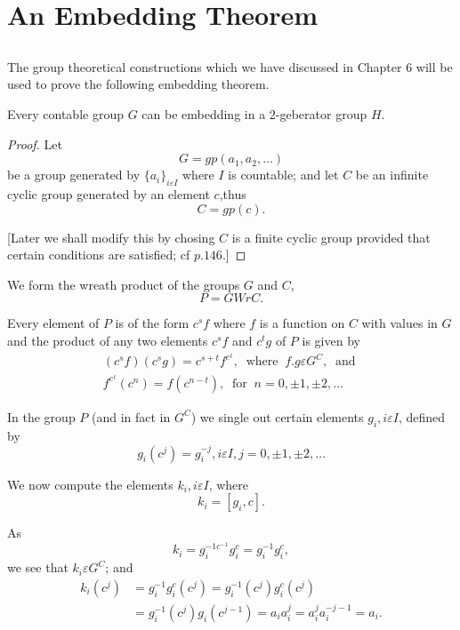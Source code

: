 \chapter{An Embedding Theorem}%

\section{}%

The group theoretical constructions which we have discussed in Chapter
$6$ will be used to prove the following embedding theorem. 
\setcounter{Theorem}{0}
\begin{Theorem}%
  Every contable group $G$ can be embedding in a $2$-geberator group $H$.
\end{Theorem}

\begin{proof}
  Let
  $$
  G = gp (a_1,a_2, \ldots)
  $$
  be a group generated by $\{ a_i\}_{i \varepsilon I}$ where $I$ is
  countable; and let $C$ be an infinite cyclic group generated by an
  element $c$,thus 
  $$
  C= gp (c).
  $$
  
  [Later we shall modify this by chosing $C$ is a finite cyclic group
    provided that certain conditions are satisfied; cf $p. 146$.] 
\end{proof}

We form the wreath product of the groups $G$ and $C$, 
$$
P= G Wr C.
$$

Every element of $P$ is of the form $c^s f$ where $f$ is a function on
$C$ with values in $G$ and the product of any two elements $c^sf$ and
$c^tg$ of $P$ is given by 
\begin{multline*}
  (c^s f) (c^s g) = c^{s+t} f^c{^{^t}}, ~\text{ where }~ f.g \varepsilon
  G^C, ~\text{ and }\\
  f^c{^{^t}} (c^n) = f (c^{n-t}), ~\text{ for }~ n =0,
  \pm 1, \pm 2,\ldots 
\end{multline*}

In the group $P$ (and in fact in $G^C$) we single out certain elements
$g_i, i \varepsilon I$, defined by 
$$
g_i (c^j) = g^{-j}_i, i \varepsilon I, j=0, \pm 1, \pm 2, \ldots
$$

We now compute the elements $k_i, i \varepsilon I$, where
$$
k_i = [g_i,c].
$$

As
$$
k_i = g^{-1 c^{-1}}_i g_i^c = g_i^{-1} g^c_i,
$$
we see that $k_i \varepsilon G^C$; and
\begin{align*}
  k_i (c^j) &= g^{-1}_i g^c_i (c^j) = g_i^{-1} (c^j) g^c_i (c^j)\\
  & = g^{-1}_i (c^j) g_i (c^{j-1}) = a_i a^j_i = a_i^j a^{-j-1}_i  = a_i.
\end{align*}

